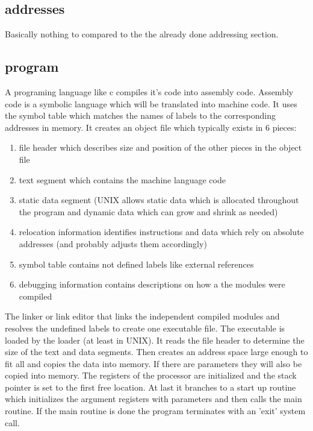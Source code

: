 \documentclass[a4paper]{scrartcl}
\begin{document}
        \subsection{addresses}
            Basically nothing to compared to the the already done addressing section.
        \subsection{program}
            A programing language like c compiles it's code into assembly code. Assembly code is a symbolic language which will be translated into machine code. It uses the 
            symbol table which matches the names of labels to the corresponding addresses in memory. It creates an object file which typically exists in 6 pieces:
            \begin{enumerate}
                \item file header which describes size and position of the other pieces in the object file
                \item text segment which contains the machine language code 
                \item static data segment (UNIX allows static data which is allocated throughout the program and dynamic data which can grow and shrink as needed)
                \item relocation information identifies instructions and data which rely on absolute addresses (and probably adjusts them accordingly)
                \item symbol table contains not defined labels like external references
                \item debugging information contains descriptions on how a the modules were compiled 
            \end{enumerate}
            The linker or link editor that links the independent compiled modules and resolves the undefined labels to create one executable file. The executable is loaded 
            by the loader (at least in UNIX). It reads the file header to determine the size of the text and data segments. Then creates an address space large enough to fit all and
            copies the data into memory. If there are parameters they will also be copied into memory. The registers of the processor are initialized and the stack pointer is set to the
            first free location. At last it branches to a start up routine which initializes the argument registers with parameters and then calls the main routine. If the main routine is done
            the program terminates with an 'exit' system call.
\end{document}
